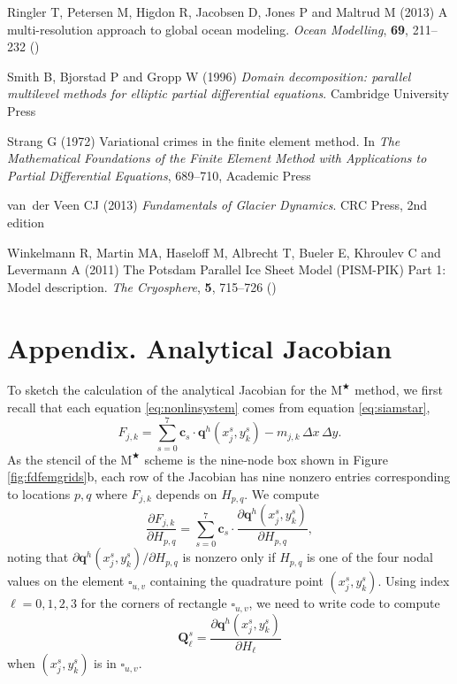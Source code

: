\documentclass[twocolumn,letterpaper]{igs}
\newcommand\bc{\mathbf{c}}
\newcommand\bq{\mathbf{q}}
\newcommand\bQ{\mathbf{Q}}
\newcommand{\Mstar}{$\text{M}^{\bigstar}$\xspace}
\begin{document}
\begin{thebibliography}{42}
Ringler T, Petersen M, Higdon R, Jacobsen D, Jones P and Maltrud M (2013) A
  multi-resolution approach to global ocean modeling. \emph{Ocean Modelling},
  \textbf{69}, 211--232 ()

Smith B, Bjorstad P and Gropp W (1996) \emph{Domain decomposition: parallel
  multilevel methods for elliptic partial differential equations}. Cambridge
  University Press

Strang G (1972) Variational crimes in the finite element method. In \emph{The
  {M}athematical {F}oundations of the {F}inite {E}lement {M}ethod with
  {A}pplications to {P}artial {D}ifferential {E}quations}, 689--710, Academic
  Press

van~der Veen CJ (2013) \emph{Fundamentals of {G}lacier {D}ynamics}. CRC Press,
  2nd edition

Winkelmann R, Martin MA, Haseloff M, Albrecht T, Bueler E, Khroulev C and
  Levermann A (2011) The {P}otsdam {P}arallel {I}ce {S}heet {M}odel
  ({PISM-PIK}) {P}art 1: {M}odel description. \emph{The Cryosphere},
  \textbf{5}, 715--726 ()

\end{thebibliography}


\appendix
\section{Appendix. Analytical Jacobian}

To sketch the calculation of the analytical Jacobian for the \Mstar method, we first recall that each equation \eqref{eq:nonlinsystem} comes from equation \eqref{eq:siamstar},
\begin{equation}
  F_{j,k} = \sum_{s=0}^7 \bc_s\cdot \bq^h(x_j^s,y_k^s) - m_{j,k}\,\Delta x\,\Delta y.  \label{eq:res}
\end{equation}
As the stencil of the \Mstar scheme is the nine-node box shown in Figure \ref{fig:fdfemgrids}b, each row of the Jacobian has nine nonzero entries corresponding to locations $p,q$ where $F_{j,k}$ depends on $H_{p,q}$.  We compute
\begin{equation}
\frac{\partial F_{j,k}}{\partial H_{p,q}} = \sum_{s=0}^7 \bc_s\cdot \frac{\partial \bq^h(x_j^s,y_k^s)}{\partial H_{p,q}}, \label{eq:jacQsum}
\end{equation}
noting that $\partial \bq^h(x_j^s,y_k^s)/\partial H_{p,q}$ is nonzero only if $H_{p,q}$ is one of the four nodal values on the element $\square_{u,v}$ containing the quadrature point $(x_j^s,y_k^s)$.  Using index $\ell=0,1,2,3$ for the corners of rectangle $\square_{u,v}$, we need to write code to compute
\begin{equation}
\bQ_\ell^s = \frac{\partial \bq^h(x_j^s,y_k^s)}{\partial H_\ell} \label{eq:jacthegoal}
\end{equation}
when $(x_j^s,y_k^s)$ is in $\square_{u,v}$.
\end{document}

